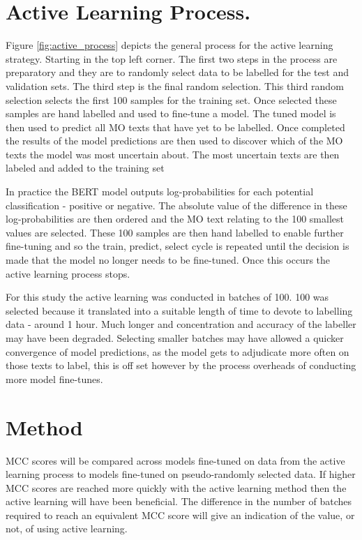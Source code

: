 \section{Active Learning Process.} Figure \ref{fig:active_process} depicts the general process for the active learning strategy. Starting in the top left corner. The first two steps in the process are preparatory and they are to randomly select data to be labelled for the test and validation sets. The third step is the final random selection. This third random selection selects the first 100 samples for the training set. Once selected these samples are hand labelled and used to fine-tune a model. The tuned model is then used to predict all MO texts that have yet to be labelled. Once completed the results of the model predictions are then used to discover which of the MO texts the model was most uncertain about. The most uncertain texts are then labeled and added to the training set

In practice the BERT model outputs log-probabilities for each potential classification - positive or negative. The absolute value of the difference in these log-probabilities are then ordered and the MO text relating to the 100 smallest values are selected. These 100 samples are then hand labelled to enable further fine-tuning and so the train, predict, select cycle is repeated until the decision is made that the model no longer needs to be fine-tuned. Once this occurs the active learning process stops. 


 For this study the active learning was conducted in batches of 100. 100 was selected because it translated into a suitable length of time to devote to labelling data - around 1 hour. Much longer and concentration and accuracy of the labeller may have been degraded. Selecting smaller batches may have allowed a quicker convergence of model predictions, as the model gets to adjudicate more often on those texts to label, this is off set however by the process overheads of conducting more model fine-tunes.
 
 
\section{Method}

MCC scores will be compared across models fine-tuned on data from the active learning process to models fine-tuned on pseudo-randomly selected data. If higher MCC scores are reached more quickly with the active learning method then the active learning will have been beneficial. The difference in the number of batches required to reach an equivalent MCC score will give an indication of the value, or not, of using active learning. 

